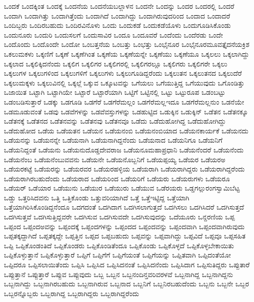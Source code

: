 {ಒಂದಕೆ
ಒಂದಕ್ಕಿಂತ
ಒಂದಕ್ಕೆ
ಒಂದನೆಯ
ಒಂದನೆಯಬಲ್ಲಾಳನ
ಒಂದನೇ
ಒಂದನ್ನು
ಒಂದರ
ಒಂದರಲ್ಲಿ
ಒಂದರೆ
ಒಂದಾಗಿ
ಒಂದಾಗಿತ್ತು
ಒಂದಾಗಿತ್ತೆಂದು
ಒಂದಾಗಿದೆ
ಒಂದಾಗಿದ್ದು
ಒಂದಾಗಿರುವುದರಿಂದ
ಒಂದಾದ
ಒಂದಾದರೆ
ಒಂದಿಬ್ಬರು
ಒಂದಿರಬಹುದು
ಒಂದಿರವಿನೊಳು
ಒಂದು
ಒಂದುಕಡೆ
ಒಂದುಕಡೆಯೊಳು
ಒಂದುಗೂಡಿಸಿಕೊಂಡು
ಒಂದುನೂರು
ಒಂದುರಿ
ಒಂದುಸಲಗೆ
ಒಂದುಸಾವಿರ
ಒಂದೂ
ಒಂದೂವರೆ
ಒಂದೆಂದು
ಒಂದೆರಡು
ಒಂದೇ
ಒಂದೊಂದು
ಒಂದೊಂದೇ
ಒಂದೋ
ಒಂಬತ್ತನೆಯ
ಒಂಬತ್ತು
ಒಂಭತ್ತು
ಒಂಭೈನೂರ
ಒಂಭೈನೂರಮೂವತ್ತೈದನೆಯಕ್ರಿಶ
ಒಕಲುಮಕಳು
ಒಕ್ಕಣಿಗೆ
ಒಕ್ಕಣೆ
ಒಕ್ಕಣೆಗಿಂತ
ಒಕ್ಕಣೆಯ
ಒಕ್ಕಣೆಯನ್ನೇ
ಒಕ್ಕಣೆಯು
ಒಕ್ಕಣೆಯೂ
ಒಕ್ಕಲಲು
ಒಕ್ಕಲಾಗಿದ್ದು
ಒಕ್ಕಲಾದ
ಒಕ್ಕಲಿಕ್ಕಿದನೆಂದು
ಒಕ್ಕಲಿಗ
ಒಕ್ಕಲಿಗರ
ಒಕ್ಕಲಿಗರಲ್ಲಿ
ಒಕ್ಕಲಿಗರಲ್ಲೂ
ಒಕ್ಕಲಿಗರು
ಒಕ್ಕಲಿಗರೇ
ಒಕ್ಕಲು
ಒಕ್ಕಲುಗಳ
ಒಕ್ಕಲುಗಳಿಂದ
ಒಕ್ಕಲುಗಳಿಗೆ
ಒಕ್ಕಲುಗಳು
ಒಕ್ಕಲುಗೂಡಿದ್ದರೆಂದು
ಒಕ್ಕಲುತನ
ಒಕ್ಕಲುತನದ
ಒಕ್ಕಲುದೆರೆ
ಒಕ್ಕಲುಮಕ್ಕಳು
ಒಕ್ಕಲುವಿನಲ್ಲಿ
ಒಕ್ಕಲ್ಗೆ
ಒಕ್ಕುವ
ಒಕ್ಕೂಟವನ್ನು
ಒಗೆಯಲು
ಒಗೆಯುತ್ತಿದ್ದ
ಒಗೆಯುವುದು
ಒಗೊಂಡಿತ್ತು
ಒಜಾಯಿತ
ಒಟ್ಟಾಗಿ
ಒಟ್ಟಾಗಿಯೇ
ಒಟ್ಟಾರೆ
ಒಟ್ಟಾರೆಯಾಗಿ
ಒಟ್ಟಿಗೆ
ಒಟ್ಟಿನಲ್ಲಿ
ಒಟ್ಟು
ಒಟ್ಟುರೂಪ
ಒಡಂಬಟ್ಟು
ಒಡಂಬಡಿಸುತ್ತಾರೆ
ಒಡಕ್ಕು
ಒಡಗೂಡಿ
ಒಡಗೆರೆ
ಒಡಗೆರೆಮಲ್ಲಂ
ಒಡಗೆರೆಮಲ್ಲಇದೂ
ಒಡಗೆರೆಮಲ್ಲನುಂ
ಒಡನೆಯೇ
ಒಡಮೂಡುವಂತೆ
ಒಡವು
ಒಡವೆಗಳನ್ನು
ಒಡವೆವಸ್ತುಗಳನ್ನು
ಒಡಹುಟ್ಟಿದ
ಒಡುಕ್ಕಿನ
ಒಡುಕ್ಕಿನ್
ಒಡೆತನ
ಒಡೆತನಕ್ಕೂ
ಒಡೆತನಕ್ಕೆ
ಒಡೆತನದ
ಒಡೆತನವನ್ನು
ಒಡೆತನವು
ಒಡೆತನವೂ
ಒಡೆದು
ಒಡೆದುಹೋಗಿದ್ದ
ಒಡೆದುಹೋಗಿದ್ದು
ಒಡೆದುಹೋದ
ಒಡೆಯ
ಒಡೆಯತನ
ಒಡೆಯನ
ಒಡೆಯನಂಬಿ
ಒಡೆಯನಂಬಿಯಾದ
ಒಡೆಯನಕಾರ್ಯಕೆ
ಒಡೆಯನದು
ಒಡೆಯನನ್ನು
ಒಡೆಯನನ್ನೇ
ಒಡೆಯನಾಗಿ
ಒಡೆಯನಾಗಿದ್ದನೆಂದು
ಒಡೆಯನಾದ
ಒಡೆಯನಿಗೂ
ಒಡೆಯನಿಗೆ
ಒಡೆಯನಿದ್ದಂತೆ
ಒಡೆಯನು
ಒಡೆಯನುದೊಡ್ಡದೇವರಾಜ
ಒಡೆಯನೂಮಹಾಪ್ರಧಾನಿ
ಒಡೆಯನೆಂದರೆ
ಒಡೆಯನೆಂದು
ಒಡೆಯನೆಂಬ
ಒಡೆಯನೆಂಬುವವನು
ಒಡೆಯನೇ
ಒಡೆಯನೊಬ್ಬನಿಗೆ
ಒಡೆಯಪ್ಪಯ್ಯ
ಒಡೆಯರ
ಒಡೆಯರಅ
ಒಡೆಯರಕಟ್ಟೆ
ಒಡೆಯರನ್ನು
ಒಡೆಯರವರ
ಒಡೆಯರಹಳ್ಳಿಯ
ಒಡೆಯರಾಗಿ
ಒಡೆಯರಾಗಿದ್ದರು
ಒಡೆಯರಾಗಿದ್ದರೆಂದು
ಒಡೆಯರಾಗಿರಬಹುದೆಂದು
ಒಡೆಯರಾದ
ಒಡೆಯರಿಂದ
ಒಡೆಯರಿಗೆ
ಒಡೆಯರು
ಒಡೆಯರುಗಳು
ಒಡೆಯರೂ
ಒಡೆಯರ್
ಒಡೆಯಾರ
ಒಡೆಯುನು
ಒಡೆಯುರ
ಒಡೆಯುರು
ಒಡೆಯುವ
ಒಡೆರಯರು
ಒಡ್ಡಗಲ್ಲುರಂಗಸ್ವಾಮಿಬೆಟ್ಟ
ಒಡ್ಡು
ಒತ್ತರಿಸಿದವನು
ಒತ್ತಿ
ಒತ್ತಿಕೊಂಡು
ಒತ್ತುವರಿಯಾಗಿದೆ
ಒತ್ತೆ
ಒತ್ತೆಇಟ್ಟಿದ್ದ
ಒತ್ತೆಯಾಗಿ
ಒತ್ತೆಯಾಗಿರಿಸಿಕೊಂಡಿದ್ದನೆಂದೂ
ಒದಗದಂತೆ
ಒದಗಿದಾಗ
ಒದಗಿಸಲಾಗುತ್ತದೆ
ಒದಗಿಸಲು
ಒದಗಿಸಿದರೆ
ಒದಗಿಸುತ್ತದೆ
ಒದಗಿಸುತ್ತವೆ
ಒದಗಿಸುತ್ತಿದ್ದವರೇ
ಒದಗಿಸುವ
ಒದಗಿಸುವದೇ
ಒದಗಿಸುವುದನ್ನು
ಒದೆಯೂರು
ಒನ್ದರಣಿಯ
ಒಪ್ಪ
ಒಪ್ಪಂದ
ಒಪ್ಪಂದಅವನ್ನು
ಒಪ್ಪಂದಕ್ಕೆ
ಒಪ್ಪಂದಗಳನ್ನು
ಒಪ್ಪಂದದ
ಒಪ್ಪಂದವನ್ನು
ಒಪ್ಪಂದವಾಗಿ
ಒಪ್ಪಂದವಾಗಿರುವುದು
ಒಪ್ಪತಕ್ಕದ್ದಾಗಿದೆ
ಒಪ್ಪತಕ್ಕದ್ದೇ
ಒಪ್ಪತ್ತಿನ
ಒಪ್ಪದ
ಒಪ್ಪಬಹುದು
ಒಪ್ಪವನ್ನು
ಒಪ್ಪವಾಗಿದ್ದು
ಒಪ್ಪವಿದೆ
ಒಪ್ಪವೂ
ಒಪ್ಪಸಹಿತ
ಒಪ್ಪಿ
ಒಪ್ಪಿಕೊಂಡಂತಿದೆ
ಒಪ್ಪಿಕೊಂಡರು
ಒಪ್ಪಿಕೊಂಡಿತೆಂದೂ
ಒಪ್ಪಿಕೊಂಡು
ಒಪ್ಪಿಕೊಳ್ಳದೆ
ಒಪ್ಪಿಕೊಳ್ಳಬೇಕಾಯಿತು
ಒಪ್ಪಿಕೊಳ್ಳುತ್ತಾನೆ
ಒಪ್ಪಿಕೊಳ್ಳುತ್ತಾರೆ
ಒಪ್ಪಿಗೆ
ಒಪ್ಪಿಗೆಗೆ
ಒಪ್ಪಿಗೆಯಂತೆ
ಒಪ್ಪಿಗೆಯನ್ನು
ಒಪ್ಪಿತವಾಗಿ
ಒಪ್ಪಿದಂತೆಯೋ
ಒಪ್ಪಿದರೂ
ಒಪ್ಪಿಸಲಾಯಿತೆಂದು
ಒಪ್ಪಿಸಿ
ಒಪ್ಪಿಸಿದ
ಒಪ್ಪಿಸಿದನಂತೆ
ಒಪ್ಪಿಸಿದನೆಂದು
ಒಪ್ಪಿಸಿದಾಗ
ಒಪ್ಪಿಸುತಿದ್ದರು
ಒಪ್ಪುತಾರೆ
ಒಪ್ಪುತ್ತಾನೆ
ಒಪ್ಪುತ್ತಾರೆ
ಒಪ್ಪುವ
ಒಪ್ಪುವುದು
ಒಬ್ಬ
ಒಬ್ಬನ
ಒಬ್ಬನಂದಿನ್ತವರಿವರಳವೆ
ಒಬ್ಬನಾಗಿದ್ದ
ಒಬ್ಬನಾಗಿದ್ದನು
ಒಬ್ಬನಾಗಿದ್ದು
ಒಬ್ಬನಾಗಿರಬಹುದು
ಒಬ್ಬನಾಗಿರುವ
ಒಬ್ಬನಾದ
ಒಬ್ಬನಿಗೆ
ಒಬ್ಬನಿರಬಹುದೆಂದು
ಒಬ್ಬನು
ಒಬ್ಬನೇ
ಒಬ್ಬರ
ಒಬ್ಬರನ್ನೊಬ್ಬರು
ಒಬ್ಬರಾಗಿದ್ದ
ಒಬ್ಬರಾಗಿದ್ದರು
ಒಬ್ಬರಾಗಿದ್ದರೆಂದು
}
